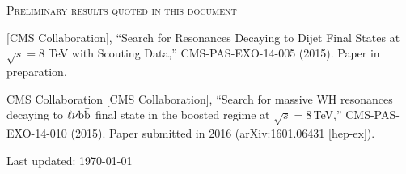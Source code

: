 \documentclass[10pt, a4paper]{article}
\begin{document}
\begin{thebibliography}{599}
\vspace{0.1cm} \begin{center} \textsc{Preliminary results quoted in this document} \end{center} \vspace{0.05cm}

 {}[CMS Collaboration],
  ``Search for Resonances Decaying to Dijet Final States at $\sqrt{s} = 8$ TeV with Scouting Data,''
  CMS-PAS-EXO-14-005 (2015). Paper in preparation.

  CMS Collaboration [CMS Collaboration],
  ``Search for massive WH resonances decaying to $\ell \nu {\rm b \bar{b}}$ final state in the boosted regime at $\sqrt{s}=8$\,TeV,''
  CMS-PAS-EXO-14-010 (2015). Paper submitted in 2016 (arXiv:1601.06431 [hep-ex]).


\end{thebibliography}

\vfill{}
\hrulefill

\begin{center}
{\footnotesize Last updated: \today}
\end{center}
\end{document}
